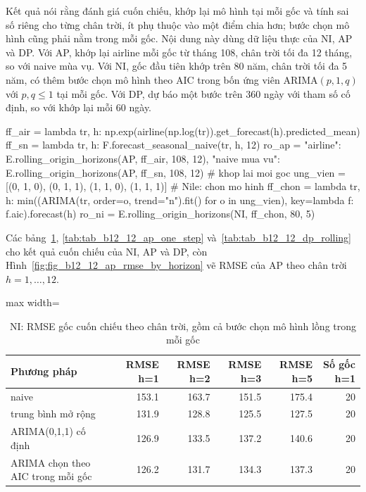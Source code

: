  Kết quả  nói rằng đánh giá cuốn chiếu, khớp lại mô hình tại mỗi gốc và tính sai số riêng cho từng chân trời, ít phụ thuộc vào một điểm chia hơn; bước chọn mô hình cũng phải nằm trong mỗi gốc.
 Nội dung này dùng dữ liệu thực của NI, AP và DP. Với AP, khớp lại airline mỗi gốc từ tháng 108, chân trời tối đa 12 tháng, so với naive mùa vụ. Với NI, gốc đầu tiên khớp trên 80 năm, chân trời tối đa 5 năm, có thêm bước chọn mô hình theo AIC trong bốn ứng viên ARIMA$(p,1,q)$ với $p,q\le1$ tại mỗi gốc. Với DP, dự báo một bước trên $360$ ngày với tham số cố định, so với khớp lại mỗi $60$ ngày.
\begin{codeblock}
ff_air = lambda tr, h: np.exp(airline(np.log(tr)).get_forecast(h).predicted_mean)
ff_sn = lambda tr, h: F.forecast_seasonal_naive(tr, h, 12)
ro_ap = {"airline": E.rolling_origin_horizons(AP, ff_air, 108, 12),
         "naive mua vu": E.rolling_origin_horizons(AP, ff_sn, 108, 12)}      # khop lai moi goc
ung_vien = [(0, 1, 0), (0, 1, 1), (1, 1, 0), (1, 1, 1)]                      # Nile: chon mo hinh
ff_chon = lambda tr, h: min((ARIMA(tr, order=o, trend="n").fit() for o in ung_vien),
                            key=lambda f: f.aic).forecast(h)
ro_ni = E.rolling_origin_horizons(NI, ff_chon, 80, 5)
\end{codeblock}
 Các bảng~\ref{tab:tab_b12_12_ni_rolling}, \ref{tab:tab_b12_12_ap_one_step} và~\ref{tab:tab_b12_12_dp_rolling} cho kết quả cuốn chiếu của NI, AP và DP, còn Hình~\ref{fig:fig_b12_12_ap_rmse_by_horizon} vẽ RMSE của AP theo chân trời $h=1,\dots,12$.
\begin{table}[H]
\centering\footnotesize
\caption{NI: RMSE gốc cuốn chiếu theo chân trời, gồm cả bước chọn mô hình lồng trong mỗi gốc}\label{tab:tab_b12_12_ni_rolling}
\begin{adjustbox}{max width=\linewidth}
\begin{tabular}{|>{\raggedright\arraybackslash}p{}|r|r|r|r|r|}
\toprule
Phương pháp & RMSE h=1 & RMSE h=2 & RMSE h=3 & RMSE h=5 & Số gốc h=1 \\
\midrule
naive & 153.1 & 163.7 & 151.5 & 175.4 & 20 \\[3pt]
trung bình mở rộng & 131.9 & 128.8 & 125.5 & 127.5 & 20 \\[3pt]
ARIMA(0,1,1) cố định & 126.9 & 133.5 & 137.2 & 140.6 & 20 \\[3pt]
ARIMA chọn theo AIC trong mỗi gốc & 126.2 & 131.7 & 134.3 & 137.3 & 20 \\[3pt]
\bottomrule
\end{tabular}
\end{adjustbox}
\end{table}

